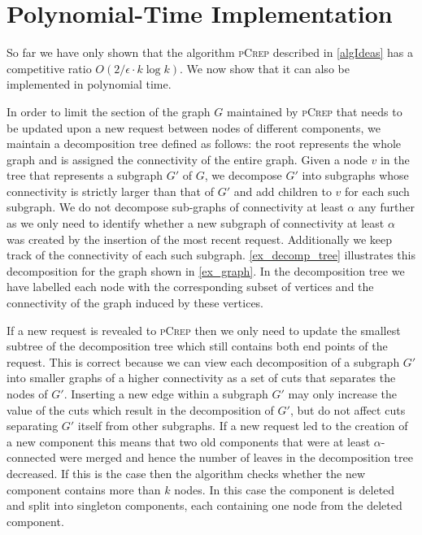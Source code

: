 \documentclass[a4paper,UKenglish,cleveref, autoref, thm-restate,authorcolumns]{../lipics/lipics-v2019}
\newcommand{\adjDel}{\textsc{pCrep}}
\begin{document}
\section{Polynomial-Time Implementation}
\label{implDetSection}

So far we have only shown that the algorithm \adjDel{} described in \cref{algIdeas} has a competitive ratio $O(2/\epsilon\cdot k \log k)$. 
We now show that it can also be implemented in polynomial time. 

In order to limit the section of the graph $G$ maintained by \adjDel{} that needs to be updated upon a new request between nodes of different components, we maintain a decomposition tree defined as follows: the root represents the whole graph and is assigned the connectivity of the entire graph. Given a node $v$ in the tree that represents a subgraph $G'$ of $G$, we decompose $G'$ into subgraphs whose connectivity is strictly larger than that of $G'$ and add children to $v$ for each such subgraph. We do not decompose sub-graphs of connectivity at least $\alpha$ any further as we only need to identify whether a new subgraph of connectivity at least $\alpha$ was created by the insertion of the most recent request.
Additionally we keep track of the connectivity of each such subgraph.
\cref{ex_decomp_tree} illustrates this decomposition for the graph shown in \cref{ex_graph}. In the decomposition tree we have labelled each node with the corresponding subset of vertices and the connectivity of the graph induced by these vertices.

If a new request is revealed to \adjDel{} then we only need to update the smallest subtree of the decomposition tree which still contains both end points of the request. 
This is correct because we can view each decomposition of a subgraph $G'$ into smaller graphs of a higher connectivity as a set of cuts that separates the nodes of $G'$. Inserting a new edge within a subgraph $G'$ may only increase the value of the cuts which result in the decomposition of $G'$, but do not affect cuts separating $G'$ itself from other subgraphs.
If a new request led to the creation of a new component this means that two old components that were at least $\alpha$-connected were merged and hence the number of leaves in the decomposition tree decreased. If this is the case then the algorithm checks whether the new component contains more than $k$ nodes. In this case the component is deleted and split into singleton components, each containing one node from the deleted component.
\end{document}
